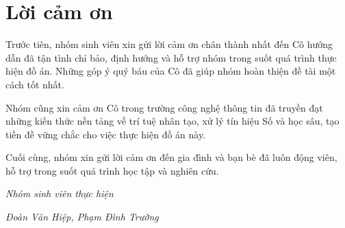 \chapter*{Lời cảm ơn}

Trước tiên, nhóm sinh viên xin gửi lời cảm ơn chân thành nhất đến Cô hướng dẫn đã tận tình chỉ bảo, định hướng và hỗ trợ nhóm trong suốt quá trình thực hiện đồ án. Những góp ý quý báu của Cô đã giúp nhóm hoàn thiện đề tài một cách tốt nhất.

Nhóm cũng xin cảm ơn Cô trong trường công nghệ thông tin đã truyền đạt những kiến thức nền tảng về trí tuệ nhân tạo, xử lý tín hiệu Số và học sâu, tạo tiền đề vững chắc cho việc thực hiện đồ án này.

Cuối cùng, nhóm xin gửi lời cảm ơn đến gia đình và bạn bè đã luôn động viên, hỗ trợ trong suốt quá trình học tập và nghiên cứu.

\vspace{1cm}
\hfill \textit{Nhóm sinh viên thực hiện}

\hfill \textit{Đoàn Văn Hiệp, Phạm Đình Trường}
\newpage

